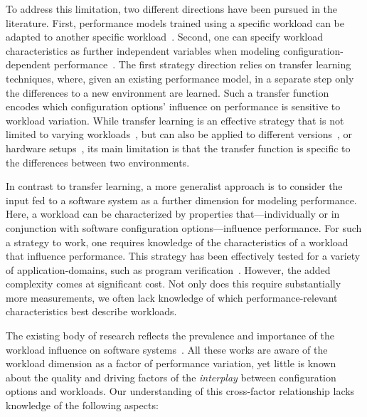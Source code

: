 To address this limitation, two different directions have been pursued in the literature. First, performance models trained using a specific workload can be adapted to another specific workload~\cite{jamishidi_transfer_2017,jamshidi_learning_2018,jamshidi_transfer_gp_2017}. Second,  one can specify workload characteristics as further independent variables when modeling configuration-dependent performance~\cite{koc_satune_2021}.
The first strategy direction relies on transfer learning techniques, where, given an existing performance model, in a separate step only the differences to a new environment are learned. Such a transfer function encodes which configuration options’ influence on performance is sensitive to workload variation. While transfer learning is an effective strategy that is not limited to varying workloads~\cite{jamshidi_learning_2018}, but can also be applied to different versions~\cite{jamishidi_transfer_2017,jamshidi_transfer_gp_2017,martin_transfer_2021}, or hardware setups~\cite{ding_bayesian_2020}, its main limitation is that the transfer function is specific to the differences between two environments.

In contrast to transfer learning, a more generalist approach is to consider the input fed to a software system as a further dimension for modeling performance. Here, a workload can be characterized by properties that---individually or in conjunction with software configuration options---influence performance. For such a strategy to work, one requires knowledge of the characteristics of a workload that influence performance. This strategy has been effectively tested for a  variety of application-domains, such as program verification~\cite{koc_satune_2021}. However, the added complexity comes at significant cost. 
Not only does this require substantially more measurements, we often lack knowledge of which performance-relevant characteristics best describe workloads.
 
The existing body of research reflects the prevalence and importance of the workload influence on software systems~\cite{khavari_compression_2019,maxiaguine_workload_2004,plotnikov_compilation_2013,ding_compilation_2015,falkner_sat_solvers_2015,satzilla_2008,alves_sampling_2020}. All these works are aware of the workload dimension as a factor of performance variation, yet little is known about the quality and driving factors of the \emph{interplay} between configuration options and workloads. Our understanding of this cross-factor relationship lacks knowledge of the following aspects:

